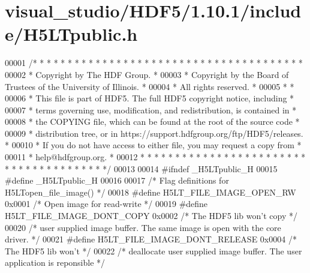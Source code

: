 \hypertarget{visual__studio_2_h_d_f5_21_810_81_2include_2_h5_l_tpublic_8h_source}{}\section{visual\+\_\+studio/\+H\+D\+F5/1.10.1/include/\+H5\+L\+Tpublic.h}
\label{visual__studio_2_h_d_f5_21_810_81_2include_2_h5_l_tpublic_8h_source}

\begin{DoxyCode}
00001 \textcolor{comment}{/* * * * * * * * * * * * * * * * * * * * * * * * * * * * * * * * * * * * * * *}
00002 \textcolor{comment}{ * Copyright by The HDF Group.                                               *}
00003 \textcolor{comment}{ * Copyright by the Board of Trustees of the University of Illinois.         *}
00004 \textcolor{comment}{ * All rights reserved.                                                      *}
00005 \textcolor{comment}{ *                                                                           *}
00006 \textcolor{comment}{ * This file is part of HDF5.  The full HDF5 copyright notice, including     *}
00007 \textcolor{comment}{ * terms governing use, modification, and redistribution, is contained in    *}
00008 \textcolor{comment}{ * the COPYING file, which can be found at the root of the source code       *}
00009 \textcolor{comment}{ * distribution tree, or in https://support.hdfgroup.org/ftp/HDF5/releases.  *}
00010 \textcolor{comment}{ * If you do not have access to either file, you may request a copy from     *}
00011 \textcolor{comment}{ * help@hdfgroup.org.                                                        *}
00012 \textcolor{comment}{ * * * * * * * * * * * * * * * * * * * * * * * * * * * * * * * * * * * * * * */}
00013 
00014 \textcolor{preprocessor}{#ifndef \_H5LTpublic\_H}
00015 \textcolor{preprocessor}{#define \_H5LTpublic\_H}
00016 
00017 \textcolor{comment}{/* Flag definitions for H5LTopen\_file\_image() */}
00018 \textcolor{preprocessor}{#define H5LT\_FILE\_IMAGE\_OPEN\_RW      0x0001 }\textcolor{comment}{/* Open image for read-write */}\textcolor{preprocessor}{}
00019 \textcolor{preprocessor}{#define H5LT\_FILE\_IMAGE\_DONT\_COPY    0x0002 }\textcolor{comment}{/* The HDF5 lib won't copy   */}\textcolor{preprocessor}{}
00020 \textcolor{comment}{/* user supplied image buffer. The same image is open with the core driver.  */}
00021 \textcolor{preprocessor}{#define H5LT\_FILE\_IMAGE\_DONT\_RELEASE 0x0004 }\textcolor{comment}{/* The HDF5 lib won't        */}\textcolor{preprocessor}{}
00022 \textcolor{comment}{/* deallocate user supplied image buffer. The user application is reponsible */}

\end{DoxyCode}

